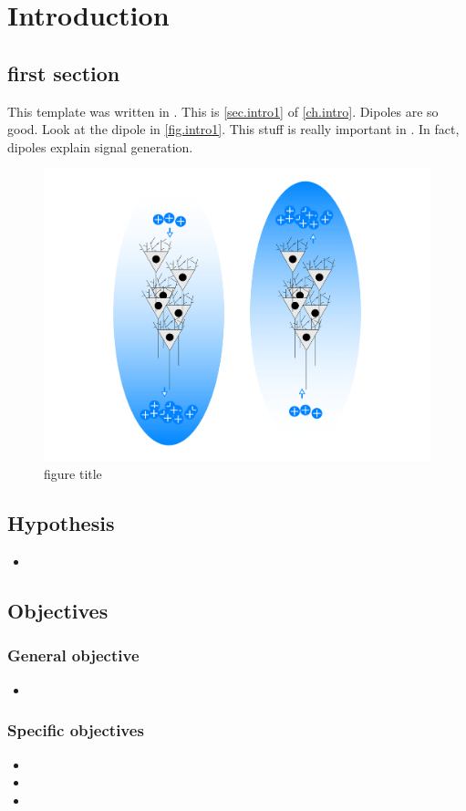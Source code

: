 \chapter{Introduction}\label{ch.intro}
\section{first section}\label{sec.intro1}

This template was written in \parencite{lamport1994latex}. 
This is \autoref{sec.intro1} of \autoref{ch.intro}. Dipoles are so good. Look at  the dipole in \autoref{fig.intro1}. This stuff is really important in . In fact, dipoles explain  signal generation.

\begin{figure}[H]
    \centering
    \includegraphics[width=0.9\linewidth,frame]{Thesis/Manuscript/Images/BodyMatter/Introduction/dipole.png}
    \caption[figure title]{figure title}
    \label{fig.intro1}
\end{figure}




\section{Hypothesis}
\begin{itemize}
    \item[\textbullet] 
\end{itemize}


\section{Objectives}

\subsection{General objective}
\begin{itemize}
    \item[\textbullet] 
\end{itemize}


\subsection{Specific objectives}
\begin{itemize}
    \item[\textbullet] 
    
    \item[\textbullet] 
    \item[\textbullet] 
\end{itemize}




